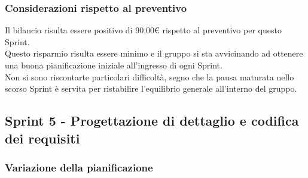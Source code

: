 \subsubsection{Considerazioni rispetto al preventivo} \label{subsubsection:considerazioni_finali_sprint4}
Il bilancio risulta essere positivo di 90,00€ rispetto al preventivo per questo Sprint\glo{}.
\\Questo risparmio risulta essere minimo e il gruppo si sta avvicinando ad ottenere una buona pianificazione iniziale all'ingresso di ogni Sprint\glo{}.
\\Non si sono riscontarte particolari difficoltà, segno che la pausa maturata nello scorso Sprint\glo{} è servita per ristabilire l'equilibrio generale all'interno del gruppo.


\subsection{Sprint 5 - Progettazione di dettaglio e codifica dei requisiti} \label{subsection:consuntivo_sprint5}
\subsubsection{Variazione della pianificazione} \label{subsubsection:variazione_pianificazione_sprint5}

